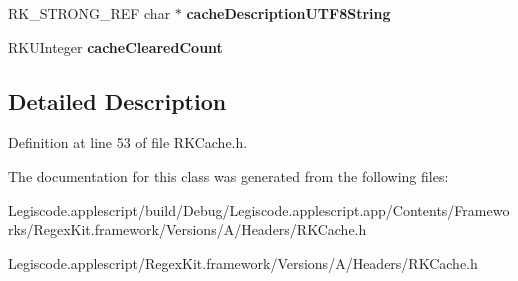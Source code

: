 \begin{DoxyCompactItemize}
\item 
\hypertarget{interface_r_k_cache_ad013c4163ffb5bb1b28953d60b4d5baf}{R\-K\-\_\-\-S\-T\-R\-O\-N\-G\-\_\-\-R\-E\-F char $\ast$ {\bfseries cache\-Description\-U\-T\-F8\-String}}\label{interface_r_k_cache_ad013c4163ffb5bb1b28953d60b4d5baf}

\item 
\hypertarget{interface_r_k_cache_ab12b57ce8aba23e168b55189cf3f3048}{R\-K\-U\-Integer {\bfseries cache\-Cleared\-Count}}\label{interface_r_k_cache_ab12b57ce8aba23e168b55189cf3f3048}

\end{DoxyCompactItemize}


\subsection{Detailed Description}


Definition at line 53 of file R\-K\-Cache.\-h.



The documentation for this class was generated from the following files\-:\begin{DoxyCompactItemize}
\item 
Legiscode.\-applescript/build/\-Debug/\-Legiscode.\-applescript.\-app/\-Contents/\-Frameworks/\-Regex\-Kit.\-framework/\-Versions/\-A/\-Headers/R\-K\-Cache.\-h\item 
Legiscode.\-applescript/\-Regex\-Kit.\-framework/\-Versions/\-A/\-Headers/R\-K\-Cache.\-h\end{DoxyCompactItemize}
